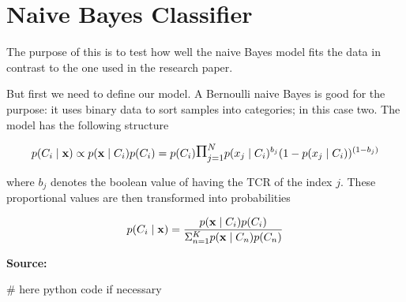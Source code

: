 \documentclass[a4paper,11pt]{article}
\begin{document}
\thispagestyle{empty}

\section*{Naive Bayes Classifier}


The purpose of this is to test how well the naive Bayes model fits the data in contrast to the one used in the research paper.

But first we need to define our model. A Bernoulli naive Bayes is good for the purpose: it uses binary data to sort samples into categories; in this case two. The model has the following structure

\[ p(C_i \mid {\bf x} ) \propto p({\bf x} \mid C_i ) p(C_i) = p(C_i)\mathlarger{\mathlarger{ \Pi }}_{j=1}^{N} p(x_j \mid C_i)^{b_j}(1 - p(x_j \mid C_i))^{(1-b_j)} \]

where $b_j$ denotes the boolean value of having the TCR of the index $j$. These proportional values are then transformed into probabilities

\[ p(C_i \mid {\bf x} ) = \frac{p({\bf x} \mid C_i ) p(C_i) }{ \Sigma_{n=1}^K p({\bf x} \mid C_n ) p(C_n)} \]


{\bf Source:}

\begin{python}
# here python code if necessary
\end{python}
\end{document}
